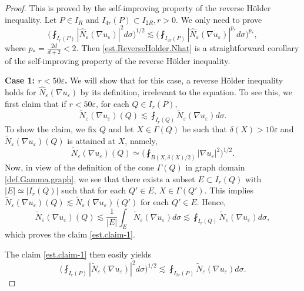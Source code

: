 \documentclass[reqno,12pt]{amsart} %
\theoremstyle{definition}
\theoremstyle{remark}
\numberwithin{equation}{section}
\newcommand{\e}{\varepsilon}
\begin{document}
\begin{proof}
This is proved by the self-improving property of the reverse H\"{o}lder inequality.
Let $P\in I_R$ and $I_{4r}(P) \subset I_{2R}, r>0$. We only need to prove
\begin{equation}\label{est.ReverseHolder.L2L1}
    \bigg( \fint_{I_r(P)} |\widehat{N}_\e(\nabla u_\e)|^2 d\sigma  \bigg)^{1/2} \lesssim \bigg( \fint_{I_{3r}(P)} |\widehat{N}_\e(\nabla u_\e)|^{p_*} d\sigma \bigg)^{p_*},
\end{equation}
where $p_* = \frac{2d}{d+2} < 2$. Then \eqref{est.ReverseHolder.Nhat} is a straightforward corollary of the self-improving property of the reverse H\"{o}lder inequality.

\textbf{Case 1: $r<50\e$.} We will show that for this case, a reverse H\"{o}lder inequality holds for $\widehat{N}_\e(\nabla u_\e)$ by its definition, irrelevant to the equation. To see this,
we first claim that if $r<50\e$, for each $Q \in I_r(P)$,
\begin{equation}\label{est.claim-1}
    \widetilde{N}_\e(\nabla u_\e)(Q) \lesssim \fint_{I_{r}(Q)} \widetilde{N}_\e(\nabla u_\e) d\sigma.
\end{equation}
To show the claim, we fix $Q$ and let $X\in \Gamma(Q)$ be such that $\delta(X) > 10\e$ and $\widetilde{N}_\e(\nabla u_\e)(Q)$ is attained at $X$, namely,
\begin{equation}
    \widetilde{N}_\e(\nabla u_\e)(Q) \simeq \bigg( \fint_{B(X,\delta(X)/2)} |\nabla u_\e|^2 \bigg)^{1/2}.
\end{equation}
Now, in view of the definition of the cone $\Gamma(Q)$ in graph domain \eqref{def.Gamma.graph}, we see that there exists a subset $E \subset I_r(Q)$ with $|E| \simeq |I_r(Q)|$ such that for each $Q' \in E$, $X \in \Gamma(Q')$. This implies $\widetilde{N}_\e(\nabla u_\e)(Q) \lesssim \widetilde{N}_\e(\nabla u_\e)(Q')$ for each $Q'\in E$. Hence,
\begin{equation}
    \widetilde{N}_\e(\nabla u_\e)(Q) \lesssim \frac{1}{|E|} \int_{E} \widetilde{N}_\e(\nabla u_\e) d\sigma \lesssim \fint_{I_r(Q)} \widetilde{N}_\e(\nabla u_\e) d\sigma,
\end{equation}
which proves the claim \eqref{est.claim-1}. 

The claim \eqref{est.claim-1} then easily yields
\begin{equation}\label{est.L2reverse-1}
    \bigg( \fint_{I_r(P)} |\widetilde{N}_\e(\nabla u_\e)|^2 d\sigma  \bigg)^{1/2} \lesssim \fint_{I_{2r}(P)} \widetilde{N}_\e(\nabla u_\e) d\sigma.
\end{equation}


\end{proof}
\end{document}
